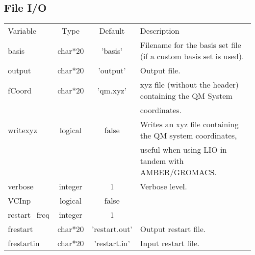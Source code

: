 \documentclass[journal=jctcce,manuscript=article]{achemso}
\begin{document}
    \subsection{File I/O}
    \begin{table}  [H]
      \begin{center}
      \begin{tabular}{ l c c l}
         Variable & Type & Default & Description \\
         basis    & char*20 & 'basis' & Filename for the basis set file (if a custom basis set is used).   \\
         output & char*20 & 'output' & Output file. \\
         fCoord & char*20 & 'qm.xyz' & xyz file (without the header) containing the QM System \\
            & & & coordinates. \\
         writexyz & logical & false & Writes an xyz file containing the QM system coordinates, \\
            & & & useful when using LIO in tandem with AMBER/GROMACS. \\
         verbose & integer & 1 & Verbose level. \\
         VCInp & logical & false & \\
         restart\_freq & integer & 1 & \\
         frestart & char*20 & 'restart.out' & Output restart file. \\
         frestartin & char*20 & 'restart.in' & Input restart file. \\
       \end{tabular}
       \end{center}
      \label{lio.fileio.var}
    \end{table}
\end{document}
